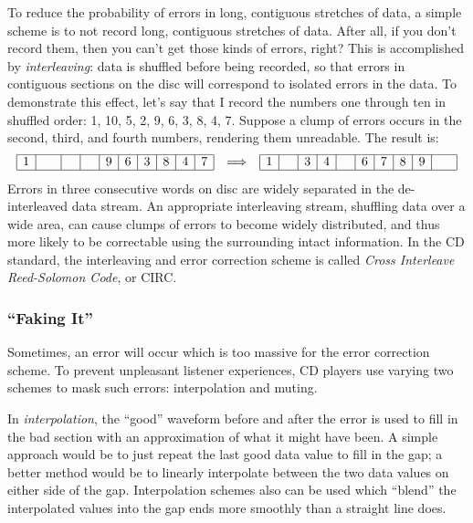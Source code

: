 To reduce the probability of errors in long, contiguous stretches of
data, a simple scheme is to not record long, contiguous stretches of
data.  After all, if you don't record them, then you can't get those
kinds of errors, right? This is accomplished by \emph{interleaving}:
data is shuffled before being recorded, so that errors in contiguous
sections on the disc will correspond to isolated errors in the
data. To demonstrate this effect, let's say that I record the numbers
one through ten in shuffled order: 1, 10, 5, 2, 9, 6, 3, 8, 4,
7. Suppose a clump of errors occurs in the second, third, and fourth
numbers, rendering them unreadable. The result is:
\begin{displaymath}
\begin{array}{rcl}
\begin{array}{|c|c|c|c|c|c|c|c|c|c|}\hline
1 & \hphantom{10}  & \hphantom{5} & \hphantom{2} & 9 & 6 & 3 & 8 & 4 & 7 \\ \hline
\end{array} &
\Longrightarrow &
\begin{array}{|c|c|c|c|c|c|c|c|c|c|}\hline
1 & \hphantom{2} & 3 & 4 & \hphantom{5}  & 6 & 7 & 8 & 9 & \hphantom{10}\\ \hline
\end{array}
\end{array}
\end{displaymath}
Errors in three consecutive words on disc are widely separated in the
de-interleaved data stream. An appropriate interleaving stream,
shuffling data over a wide area, can cause clumps of errors to become
widely distributed, and thus more likely to be correctable using the
surrounding intact information. In the CD standard, the interleaving
and error correction scheme is called \emph{Cross Interleave
Reed-Solomon Code}, or CIRC.

\subsubsection{``Faking It''}

Sometimes, an error will occur which is too massive for the error
correction scheme. To prevent unpleasant listener experiences, CD
players use varying two schemes to mask such errors: interpolation and
muting.

In \emph{interpolation}, the ``good'' waveform before and after the
error is used to fill in the bad section with an approximation of what
it might have been. A simple approach would be to just repeat the last
good data value to fill in the gap; a better method would be to
linearly interpolate between the two data values on either side of the
gap. Interpolation schemes also can be used which ``blend'' the
interpolated values into the gap ends more smoothly than a straight
line does.

